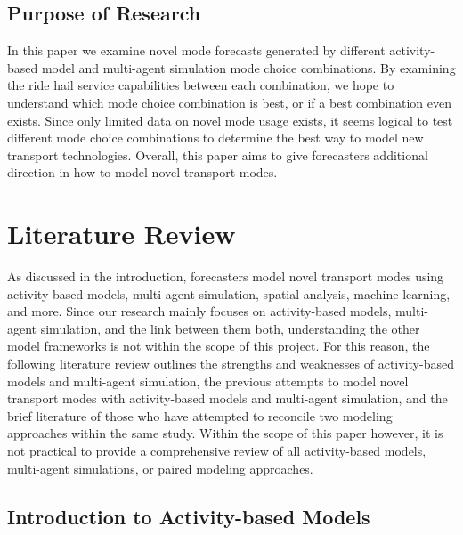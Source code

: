 \documentclass[12pt, oneside, openright]{byuthesis}
\begin{document}
\hypertarget{purpose-of-research}{%
\section{Purpose of Research}\label{purpose-of-research}}

In this paper we examine novel mode forecasts generated by different activity-based model and multi-agent simulation mode choice combinations. By examining the ride hail service capabilities between each combination, we hope to understand which mode choice combination is best, or if a best combination even exists. Since only limited data on novel mode usage exists, it seems logical to test different mode choice combinations to determine the best way to model new transport technologies. Overall, this paper aims to give forecasters additional direction in how to model novel transport modes.

\hypertarget{lit}{%
\chapter{Literature Review}\label{lit}}

As discussed in the introduction, forecasters model novel transport modes using activity-based models, multi-agent simulation, spatial analysis, machine learning, and more. Since our research mainly focuses on activity-based models, multi-agent simulation, and the link between them both, understanding the other model frameworks is not within the scope of this project. For this reason, the following literature review outlines the strengths and weaknesses of activity-based models and multi-agent simulation, the previous attempts to model novel transport modes with activity-based models and multi-agent simulation, and the brief literature of those who have attempted to reconcile two modeling approaches within the same study. Within the scope of this paper however, it is not practical to provide a comprehensive review of all activity-based models, multi-agent simulations, or paired modeling approaches.

\hypertarget{lit-abm}{%
\section{Introduction to Activity-based Models}\label{lit-abm}}
\end{document}
